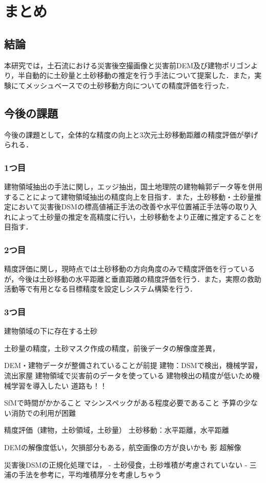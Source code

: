 \chapter{まとめ}
  \section{結論}
    本研究では，土石流における災害後空撮画像と災害前DEM及び建物ポリゴンより，半自動的に土砂量と土砂移動の推定を行う手法について提案した．また，実験にてメッシュベースでの土砂移動方向についての精度評価を行った．



  \section{今後の課題}
    今後の課題として，全体的な精度の向上と3次元土砂移動距離の精度評価が挙げられる．


    \subsection*{1つ目}
      建物領域抽出の手法に関し，エッジ抽出，国土地理院の建物輪郭データ等を併用することによって建物領域抽出の精度向上を目指す．また，土砂移動・土砂量推定において災害後DSMの標高値補正手法の改善や水平位置補正手法\cite{土砂量解析1}等の取り入れによって土砂量の推定を高精度に行い，土砂移動をより正確に推定することを目指す．


    \subsection*{2つ目}
      精度評価に関し，現時点では土砂移動の方向角度のみで精度評価を行っているが，今後は土砂移動の水平距離と垂直距離の精度評価を行う．また，実際の救助活動等で有用となる目標精度を設定しシステム構築を行う．

      
    \subsection*{3つ目}
      建物領域の下に存在する土砂

      土砂量の精度，土砂マスク作成の精度，前後データの解像度差異，


      DEM・建物データが整備されていることが前提
        建物：DSMで検出，機械学習，流出家屋
        建物領域で災害前のデータを使っている
        建物検出の精度が低いため機械学習を導入したい
        道路も！！

      SfMで時間がかかること
        マシンスペックがある程度必要であること
        予算の少ない消防での利用が困難


      精度評価（建物，土砂領域，土砂量）
        土砂移動：水平距離，水平距離

      DEMの解像度低い，欠損部分もある，航空画像の方が良いかも
      影
      超解像

      災害後DSMの正規化処理では，
      - 土砂侵食，土砂堆積が考慮されていない
      - 三浦の手法を参考に，平均堆積厚分を考慮しちゃう



